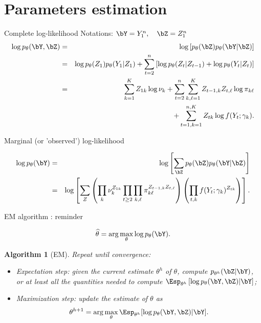 \documentclass[compress,10pt]{beamer}
\newtheorem{algorithm}{Algorithm}
\begin{document}
\section{Parameters estimation}
\begin{frame}{Complete log-likelihood}
\textcolor{dgreen}{Notations}:   $\bY = Y_1^n, \quad   \bZ = Z_{1}^n$
\begin{eqnarray*}
\log p_\theta(\bY, \bZ) & = & \log \left[p_\theta(\bZ) p_\theta(\bY|\bZ)\right] \\
&=& \log  p_\theta(Z_1) p_\theta(Y_1|Z_1) + \sum_{t=2}^n \left[ \log  p_\theta(Z_t | Z_{t-1}) + \log  p_\theta(Y_t|Z_t)\right]\\
  & = & \sum_{k=1}^K Z_{1k} \log \nu_k + \sum_{t =2}^n \sum_{k, \ell=1 }^K {Z_{t-1, k} Z_{t, \ell}} \log \pi_{k\ell}\\
&&  + \sum_{t=1, k=1}^{n,K} {Z_{tk} \log f(Y_t; \gamma_k)}.
\end{eqnarray*}

\label{HMM:completell}

\end{frame}
\begin{frame}{Marginal (or 'observed') log-likelihood}
 
\begin{eqnarray*}
\log p_\theta(\bY) & = & \log \left[\sum_\bZ p_\theta(\bZ) p_\theta(\bY|\bZ)\right] \\
 & = & \log \left[\sum_Z \left(\prod_k \nu_k^{Z_{1k}} \prod_{t \geq 2} \prod_{k, \ell} \pi_{k\ell}^{Z_{t-1, k} Z_{t, \ell}}\right)  \left(\prod_{t, k} f(Y_t; \gamma_k)^{Z_{tk}}\right)\right].
\end{eqnarray*}
\end{frame}

 
\begin{frame}{EM algorithm : reminder}

$$
\widehat{\theta} = \arg\max_\theta \log p_\theta(\bY).
$$
\label{Algo:EM}

\begin{algorithm}[EM] 
 Repeat until convergence:
  \begin{itemize}
   \item \textcolor{dgreen}{Expectation step:} given the current estimate $\theta^h$ of $\theta$, compute $p_{\theta^h}(\bZ|\bY)$, or at least all the quantities needed to compute $\Esp_{\theta^h}\left[\log p_\theta(\bY, \bZ) |\bY\right]$;
   \item \textcolor{dgreen}{Maximization step:} update the estimate of $\theta$ as
   $$
   \theta^{h+1} = \arg\max_\theta \Esp_{\theta^h}[\log p_\theta(\bY, \bZ) |\bY].
   $$
  \end{itemize}
\end{algorithm}
\end{frame}
\end{document}
